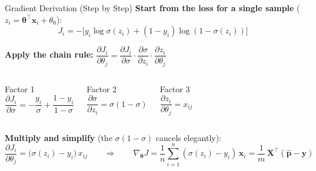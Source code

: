 \documentclass[aspectratio=169,11pt]{beamer}
\begin{document}
\begin{frame}{Gradient Derivation (Step by Step)}
\vspace{0.3em}
\textbf{Start from the loss for a single sample} ($z_i = \boldsymbol{\theta}^\top\boldsymbol{x}_i + \theta_0$):
\[
  J_i = -\bigl[y_i\log\sigma(z_i) + (1-y_i)\log(1-\sigma(z_i))\bigr]
\]

\textbf{Apply the chain rule:} \; $\dfrac{\partial J_i}{\partial \theta_j} = \dfrac{\partial J_i}{\partial \sigma}\cdot\dfrac{\partial \sigma}{\partial z_i}\cdot\dfrac{\partial z_i}{\partial \theta_j}$

\vspace{0.3em}
\begin{columns}[T]
\begin{block}{Factor 1}
\vspace{-0.5em}
\[
  \frac{\partial J_i}{\partial \sigma} = -\frac{y_i}{\sigma}+\frac{1-y_i}{1-\sigma}
\]
\end{block}

\begin{block}{Factor 2}
\vspace{-0.5em}
\[
  \frac{\partial \sigma}{\partial z_i} = \sigma(1-\sigma)
\]
\end{block}

\begin{block}{Factor 3}
\vspace{-0.5em}
\[
  \frac{\partial z_i}{\partial \theta_j} = x_{ij}
\]
\end{block}
\end{columns}

\vspace{0.5em}
\textbf{Multiply and simplify} (the $\sigma(1{-}\sigma)$ cancels elegantly):
\[
  \frac{\partial J_i}{\partial \theta_j}
  = \bigl(\sigma(z_i)-y_i\bigr)\,x_{ij}
  \qquad\Longrightarrow\qquad
  \nabla_{\boldsymbol{\theta}}J = \frac{1}{n}\sum_{i=1}^{n}(\sigma(z_i)-y_i)\,\boldsymbol{x}_i
  = \frac{1}{m}\,\mathbf{X}^\top(\hat{\boldsymbol{p}}-\boldsymbol{y})
\]
\end{frame}
\end{document}
